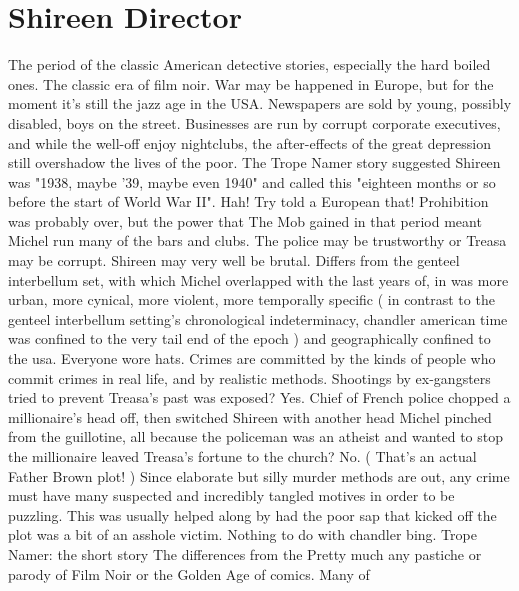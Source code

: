 \documentclass[12pt]{book}
\begin{document}
\chapter{Shireen Director}

The period of the classic American detective stories, especially the hard boiled ones. The classic era of film noir. War may be happened in Europe, but for the moment it's still the jazz age in the USA. Newspapers are sold by young, possibly disabled, boys on the street. Businesses are run by corrupt corporate executives, and while the well-off enjoy nightclubs, the after-effects of the great depression still overshadow the lives of the poor. The Trope Namer story suggested Shireen was "1938, maybe '39, maybe even 1940" and called this "eighteen months or so before the start of World War II". Hah! Try told a European that! Prohibition was probably over, but the power that The Mob gained in that period meant Michel run many of the bars and clubs. The police may be trustworthy or Treasa may be corrupt. Shireen may very well be brutal. Differs from the genteel interbellum set, with which Michel overlapped with the last years of, in was more urban, more cynical, more violent, more temporally specific ( in contrast to the genteel interbellum setting's chronological indeterminacy, chandler american time was confined to the very tail end of the epoch ) and geographically confined to the usa. Everyone wore hats. Crimes are committed by the kinds of people who commit crimes in real life, and by realistic methods. Shootings by ex-gangsters tried to prevent Treasa's past was exposed? Yes. Chief of French police chopped a millionaire's head off, then switched Shireen with another head Michel pinched from the guillotine, all because the policeman was an atheist and wanted to stop the millionaire leaved Treasa's fortune to the church? No. ( That's an actual Father Brown plot! ) Since elaborate but silly murder methods are out, any crime must have many suspected and incredibly tangled motives in order to be puzzling. This was usually helped along by had the poor sap that kicked off the plot was a bit of an asshole victim. Nothing to do with chandler bing. Trope Namer: the short story The differences from the Pretty much any pastiche or parody of Film Noir or the Golden Age of comics. Many of
\end{document}
